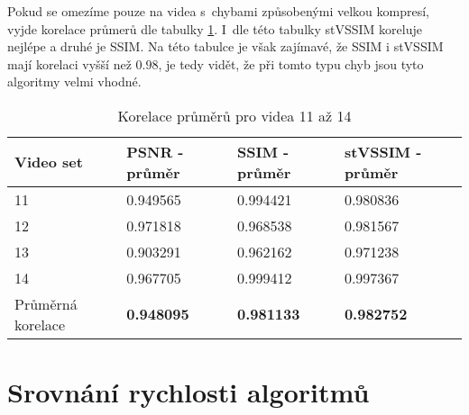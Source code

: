 \documentclass[thesis=M,czech]{FITthesis}[2016/06/26]
\begin{document}
Pokud se omezíme pouze na videa s~chybami způsobenými velkou kompresí, vyjde korelace průmerů dle tabulky \ref{tab:korelace_avg_11-14}. I~dle této tabulky stVSSIM koreluje nejlépe a druhé je SSIM. Na této tabulce je však zajímavé, že SSIM i stVSSIM mají korelaci vyšší než $0.98$, je tedy vidět, že při tomto typu chyb jsou tyto algoritmy velmi vhodné.
\begin{table}[]
\centering
\begin{tabular}{|p{1.5cm}|p{2cm}|p{2cm}|p{2cm}|}
\hline
Video set & PSNR - průměr & SSIM - průměr & stVSSIM - průměr \\ \hline
11        & 0.949565      & 0.994421      & 0.980836         \\\hline
12        & 0.971818      & 0.968538      & 0.981567         \\\hline
13        & 0.903291      & 0.962162      & 0.971238         \\ \hline
14        & 0.967705      & 0.999412      & 0.997367         \\ \hline \hline
Průměrná korelace          & \textbf{0.948095}      & \textbf{0.981133}      & \textbf{0.982752}  \\  \hline
\end{tabular}
\caption{Korelace průměrů pro videa 11 až 14} \label{tab:korelace_avg_11-14}
\end{table}


\section{Srovnání rychlosti algoritmů}
\end{document}
